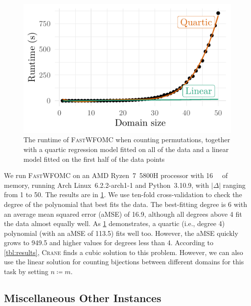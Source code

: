 \documentclass{article}
\begin{document}
\begin{figure}[t]
  \includegraphics{plot}
  \caption{The runtime of \textsc{FastWFOMC} when counting permutations,
    together with a quartic regression model fitted on all of the data and a
    linear model fitted on the first half of the data
    points}\label{fig:fastwfomc}
\end{figure}

We run \textsc{FastWFOMC} on an AMD Ryzen~7~5800H processor with
\SI{16}{\giga\byte} of memory, running Arch Linux~6.2.2-arch1-1 and
Python~3.10.9, with $|\Delta|$ ranging from 1 to 50. The results are in
\cref{fig:fastwfomc}. We use ten-fold cross-validation to check the degree of
the polynomial that best fits the data. The best-fitting degree is 6 with an
average mean squared error (aMSE) of 16.9, although all degrees above 4 fit the
data almost equally well. As \cref{fig:fastwfomc} demonstrates, a quartic (i.e.,
degree 4) polynomial (with an aMSE of 113.5) fits well too. However, the aMSE
quickly grows to 949.5 and higher values for degrees less than 4. According to
\cref{tbl:results}, \textsc{Crane} finds a cubic solution to this problem.
However, we can also use the linear solution for counting bijections between
different domains for this task by setting $n \coloneqq m$.

\subsection{Miscellaneous Other Instances}
\end{document}
